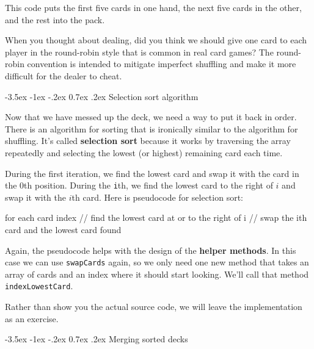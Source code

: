 \documentclass[12pt]{book}
\makeatletter
\theoremstyle{exercise}
\newcommand{\java}[1]{\verb"#1"}
\renewcommand{\section}{\@startsection {section}{1}{\z@}%
    {-3.5ex \@plus -1ex \@minus -.2ex}%
    {0.7ex \@plus.2ex}%
    {\normalfont\Large\bfseries}}
\newcommand{\java}[1]{\lstinline{#1}} %
\makeatother
\begin{document}
This code puts the first five cards in one hand, the next five cards in the other, and the rest into the pack.

When you thought about dealing, did you think we should give one card to each player in the round-robin style that is common in real card games?
The round-robin convention is intended to mitigate imperfect shuffling and make it more difficult for the dealer to cheat.



\section{Selection sort algorithm}
\label{sorting}


Now that we have messed up the deck, we need a way to put it back in order.
There is an algorithm for sorting that is ironically similar to the algorithm for shuffling.
It's called {\bf selection sort} because it works by traversing the array repeatedly and selecting the lowest (or highest) remaining card each time.

During the first iteration, we find the lowest card and swap it with the card in the 0th position.
During the \java{i}th, we find the lowest card to the right of $i$ and swap it with the $i$th card.
Here is pseudocode for selection sort:

\begin{code}
    for each card index {
        // find the lowest card at or to the right of i
        // swap the ith card and the lowest card found
    }
\end{code}


Again, the pseudocode helps with the design of the {\bf helper methods}.
In this case we can use \java{swapCards} again, so we only need one new method that takes an array of cards and an index where it should start looking.
We'll call that method \java{indexLowestCard}.

Rather than show you the actual source code, we will leave the implementation as an exercise.


\section{Merging sorted decks}
\label{mergesort}
\end{document}
